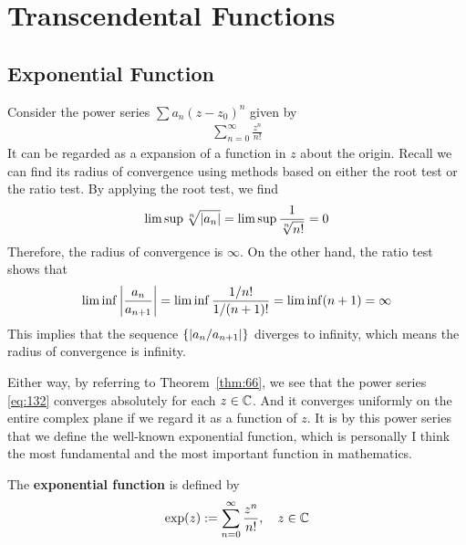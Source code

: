 \documentclass[thmcnt=section, 12pt]{my-elegantbook}
\begin{document}

\chapter{Transcendental Functions}


\section{Exponential Function}

Consider the power series $\sum a_n (z - z_0)^n$ given by
\begin{align}
    \sum_{n=0}^\infty \frac{z^n}{n!}
    \label{eq:132}
\end{align}
It can be regarded as a expansion of a function in $z$
about the origin.
Recall we can find its radius of convergence
using methods based on
either the root test or the ratio test.
By applying the root test, we find
\begin{align*}
    \limsup \sqrt[n]{\left\lvert a_n \right\rvert}
    = \limsup \frac{1}{\sqrt[n]{n!}}
    = 0
\end{align*}
Therefore, the radius of convergence is $\infty$.
On the other hand, the ratio test shows that
\begin{align*}
    \liminf \left\lvert \frac{a_n}{a_{n+1}} \right\rvert
    = \liminf \frac{1 / n!}{1 / (n+1)!}
    = \liminf (n+1)
    = \infty
\end{align*}
This implies that the sequence
$\{\left\lvert a_{n} /  a_{n+1} \right\rvert\}$ diverges to infinity,
which means the radius of convergence is infinity.

Either way, by referring to Theorem~\ref{thm:66},
we see that the power series \eqref{eq:132}
converges absolutely for each $z \in \mathbb{C}$.
And it converges uniformly on the entire complex plane
if we regard it as a function of $z$.
It is by this power series that we define
the well-known exponential function,
which is personally I think the most fundamental
and the most important function in mathematics.

\begin{definition}\label{def:4}
    The \textbf{exponential function}
    is defined by
    \begin{align*}
        \exp(z) := \sum_{n=0}^\infty \frac{z^n}{n!},
        \quad z \in \mathbb{C}
    \end{align*}
\end{definition}
\end{document}

